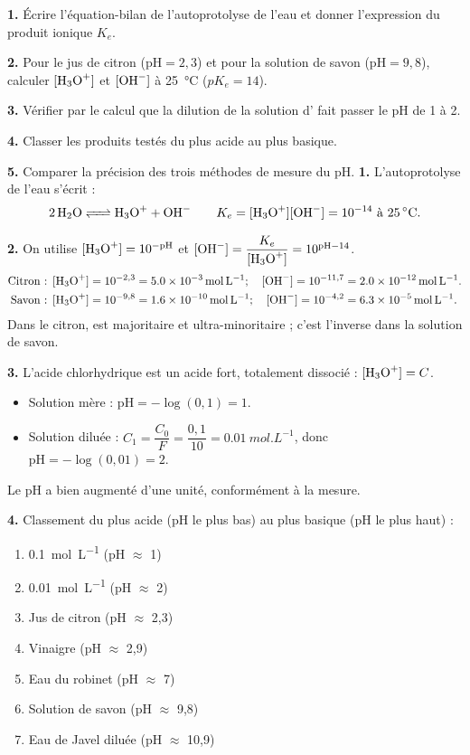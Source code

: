 \documentclass[11pt]{article}
\newcommand{\cle}[1]{{\popxbold\color{popdark}#1}}
\begin{document}
\begin{exoresolu}
\textbf{1.} Écrire l'équation-bilan de l'autoprotolyse de l'eau et donner l'expression du produit ionique $K_e$.

\textbf{2.} Pour le jus de citron ($\mathrm{pH} = 2,3$) et pour la solution de savon ($\mathrm{pH} = 9,8$), calculer $[\ce{H3O+}]$ et $[\ce{OH-}]$ à \SI{25}{\celsius} ($pK_e = 14$).

\textbf{3.} Vérifier par le calcul que la dilution de la solution d' fait passer le pH de 1 à 2.

\textbf{4.} Classer les produits testés du plus acide au plus basique.

\textbf{5.} Comparer la précision des trois méthodes de mesure du pH.
\tcblower
\textbf{1.} L'autoprotolyse de l'eau s'écrit :
\[ \ce{2 H2O <=> H3O+ + OH-} \qquad K_e = [\ce{H3O+}][\ce{OH-}] = 10^{-14} \text{ à } \SI{25}{\celsius}. \]

\textbf{2.} On utilise $[\ce{H3O+}] = 10^{-\mathrm{pH}}$ et $[\ce{OH-}] = \dfrac{K_e}{[\ce{H3O+}]} = 10^{\mathrm{pH}-14}$.
\begin{align*}
\text{Citron : } & [\ce{H3O+}] = 10^{-2,3} = \SI{5,0e-3}{mol.L^{-1}} ; \quad [\ce{OH-}] = 10^{-11,7} = \SI{2,0e-12}{mol.L^{-1}}.\\
\text{Savon : } & [\ce{H3O+}] = 10^{-9,8} = \SI{1,6e-10}{mol.L^{-1}} ; \quad [\ce{OH-}] = 10^{-4,2} = \SI{6,3e-5}{mol.L^{-1}}.
\end{align*}
Dans le citron,  est \cle{majoritaire} et  \cle{ultra-minoritaire} ; c'est l'inverse dans la solution de savon.

\textbf{3.} L'acide chlorhydrique est un acide fort, totalement dissocié : $[\ce{H3O+}] = C$.
\begin{itemize}
\item Solution mère : $\mathrm{pH} = -\log(0,1) = 1$.
\item Solution diluée : $C_1 = \dfrac{C_0}{F} = \dfrac{0,1}{10} = \SI{0,01}{mol.L^{-1}}$, donc $\mathrm{pH} = -\log(0,01) = 2$.
\end{itemize}
Le pH a bien augmenté d'une unité, conformément à la mesure.

\textbf{4.} Classement du plus acide (pH le plus bas) au plus basique (pH le plus haut) :
\begin{enumerate}
\item {} \SI{0,1}{mol.L^{-1}} (pH $\approx$ 1)
\item {} \SI{0,01}{mol.L^{-1}} (pH $\approx$ 2)
\item Jus de citron (pH $\approx$ 2,3)
\item Vinaigre (pH $\approx$ 2,9)
\item Eau du robinet (pH $\approx$ 7)
\item Solution de savon (pH $\approx$ 9,8)
\item Eau de Javel diluée (pH $\approx$ 10,9)
\end{enumerate}


\end{exoresolu}
\end{document}
